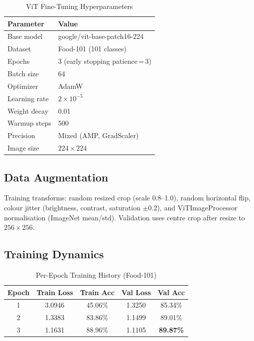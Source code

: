 \documentclass[fleqn,10pt]{SelfArx}
\begin{document}
\begin{table}[!htb]
\centering
\caption{ViT Fine-Tuning Hyperparameters}
\label{tab:hyperparams}
\small
\begin{tabular}{@{}ll@{}}
\toprule
\textbf{Parameter}       & \textbf{Value} \\
\midrule
Base model               & google/vit-base-patch16-224 \\
Dataset                  & Food-101 (101 classes) \\
Epochs                   & 3 (early stopping patience\,=\,3) \\
Batch size               & 64 \\
Optimizer                & AdamW \\
Learning rate            & $2 \times 10^{-5}$ \\
Weight decay             & 0.01 \\
Warmup steps             & 500 \\
Precision                & Mixed (AMP, GradScaler) \\
Image size               & $224 \times 224$ \\
\bottomrule
\end{tabular}
\end{table}

\subsection{Data Augmentation}

Training transforms: random resized crop (scale 0.8--1.0), random horizontal flip, colour jitter (brightness, contrast, saturation $\pm 0.2$), and ViTImageProcessor normalisation (ImageNet mean/std). Validation uses centre crop after resize to $256 \times 256$.

\subsection{Training Dynamics}

\begin{table}[!htb]
\centering
\caption{Per-Epoch Training History (Food-101)}
\label{tab:training_history}
\small
\begin{tabular}{@{}ccccc@{}}
\toprule
\textbf{Epoch} & \textbf{Train Loss} & \textbf{Train Acc} & \textbf{Val Loss} & \textbf{Val Acc} \\
\midrule
1 & 3.0946 & 45.06\% & 1.3250 & 85.34\% \\
2 & 1.3383 & 83.86\% & 1.1499 & 89.01\% \\
3 & 1.1631 & 88.96\% & 1.1105 & \textbf{89.87\%} \\
\bottomrule
\end{tabular}
\end{table}
\end{document}
